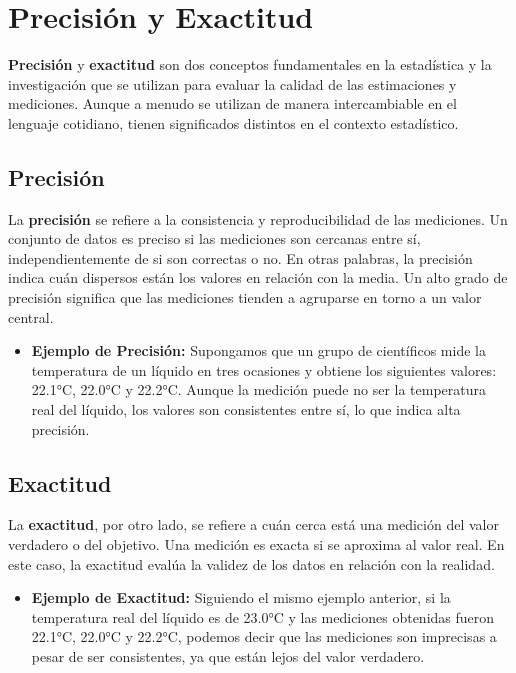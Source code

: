 \documentclass[
  letterpaper,
  DIV=11,
  numbers=noendperiod]{scrreprt}
\providecommand{\tightlist}{%
  \setlength{\itemsep}{0pt}\setlength{\parskip}{0pt}}\usepackage{longtable,booktabs,array}
\begin{document}
\section{Precisión y Exactitud}\label{precisiuxf3n-y-exactitud}

\textbf{Precisión} y \textbf{exactitud} son dos conceptos fundamentales
en la estadística y la investigación que se utilizan para evaluar la
calidad de las estimaciones y mediciones. Aunque a menudo se utilizan de
manera intercambiable en el lenguaje cotidiano, tienen significados
distintos en el contexto estadístico.

\subsection{Precisión}\label{precisiuxf3n}

La \textbf{precisión} se refiere a la consistencia y reproducibilidad de
las mediciones. Un conjunto de datos es preciso si las mediciones son
cercanas entre sí, independientemente de si son correctas o no. En otras
palabras, la precisión indica cuán dispersos están los valores en
relación con la media. Un alto grado de precisión significa que las
mediciones tienden a agruparse en torno a un valor central.

\begin{itemize}
\tightlist
\item
  \textbf{Ejemplo de Precisión:} Supongamos que un grupo de científicos
  mide la temperatura de un líquido en tres ocasiones y obtiene los
  siguientes valores: 22.1°C, 22.0°C y 22.2°C. Aunque la medición puede
  no ser la temperatura real del líquido, los valores son consistentes
  entre sí, lo que indica alta precisión.
\end{itemize}

\subsection{Exactitud}\label{exactitud}

La \textbf{exactitud}, por otro lado, se refiere a cuán cerca está una
medición del valor verdadero o del objetivo. Una medición es exacta si
se aproxima al valor real. En este caso, la exactitud evalúa la validez
de los datos en relación con la realidad.

\begin{itemize}
\tightlist
\item
  \textbf{Ejemplo de Exactitud:} Siguiendo el mismo ejemplo anterior, si
  la temperatura real del líquido es de 23.0°C y las mediciones
  obtenidas fueron 22.1°C, 22.0°C y 22.2°C, podemos decir que las
  mediciones son imprecisas a pesar de ser consistentes, ya que están
  lejos del valor verdadero.
\end{itemize}
\end{document}
